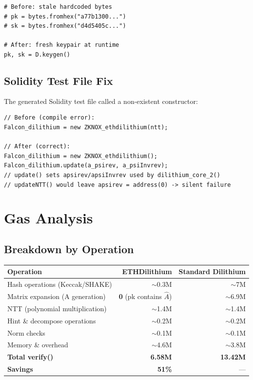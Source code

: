 \documentclass[11pt,a4paper]{article}
\begin{document}
\begin{lstlisting}[style=python, caption={Fix in generate\_ethdilithium\_test\_vectors.py}]
# Before: stale hardcoded bytes
# pk = bytes.fromhex("a77b1300...")
# sk = bytes.fromhex("d4d5405c...")

# After: fresh keypair at runtime
pk, sk = D.keygen()
\end{lstlisting}

\subsection{Solidity Test File Fix}

The generated Solidity test file called a non-existent constructor:
\begin{lstlisting}[style=solidity, caption={Fix in setUp() of generated test}]
// Before (compile error):
Falcon_dilithium = new ZKNOX_ethdilithium(ntt);

// After (correct):
Falcon_dilithium = new ZKNOX_ethdilithium();
Falcon_dilithium.update(a_psirev, a_psiInvrev);
// update() sets apsirev/apsiInvrev used by dilithium_core_2()
// updateNTT() would leave apsirev = address(0) -> silent failure
\end{lstlisting}

\section{Gas Analysis}

\subsection{Breakdown by Operation}

\begin{center}
\begin{tabular}{lrr}
\toprule
\textbf{Operation} & \textbf{ETHDilithium} & \textbf{Standard Dilithium} \\
\midrule
Hash operations (Keccak/SHAKE) & $\sim$0.3M & $\sim$7M \\
Matrix expansion (A generation) & \textbf{0} (pk contains $\hat{A}$) & $\sim$6.9M \\
NTT (polynomial multiplication) & $\sim$1.4M & $\sim$1.4M \\
Hint \& decompose operations & $\sim$0.2M & $\sim$0.2M \\
Norm checks & $\sim$0.1M & $\sim$0.1M \\
Memory \& overhead & $\sim$4.6M & $\sim$3.8M \\
\midrule
\textbf{Total verify()} & \textbf{6.58M} & \textbf{13.42M} \\
\textbf{Savings} & \textbf{51\%} & — \\
\bottomrule
\end{tabular}
\end{center}
\end{document}
